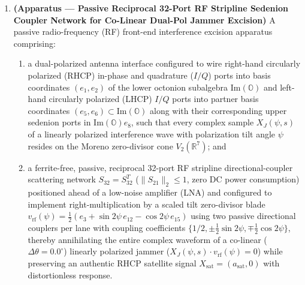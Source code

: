 \documentclass[12pt,letterpaper]{article}
\begin{document}
\begin{enumerate}[leftmargin=20pt,itemsep=4pt]
    \item \textbf{(Apparatus --- Passive Reciprocal 32-Port RF Stripline Sedenion Coupler Network for Co-Linear Dual-Pol Jammer Excision)} A passive radio-frequency (RF) front-end interference excision apparatus comprising:
    \begin{enumerate}[leftmargin=16pt,itemsep=1pt]
        \item a dual-polarized antenna interface configured to wire right-hand circularly polarized (RHCP) in-phase and quadrature ($I/Q$) ports into basis coordinates $(e_1, e_2)$ of the lower octonion subalgebra $\mathrm{Im}(\mathbb{O})$ and left-hand circularly polarized (LHCP) $I/Q$ ports into partner basis coordinates $(e_5, e_6) \subset \mathrm{Im}(\mathbb{O})$ along with their corresponding upper sedenion ports in $\mathrm{Im}(\mathbb{O})e_8$, such that every complex sample $X_J(\psi, s)$ of a linearly polarized interference wave with polarization tilt angle $\psi$ resides on the Moreno zero-divisor cone $V_2(\mathbb{R}^7)$; and
        \item a ferrite-free, passive, reciprocal 32-port RF stripline directional-coupler scattering network $S_{32} = S_{32}^T$ ($\|S_{21}\|_2 \le 1$, zero DC power consumption) positioned ahead of a low-noise amplifier (LNA) and configured to implement right-multiplication by a scaled tilt zero-divisor blade $v_{\mathrm{rf}}(\psi) = \frac{1}{2}(e_3 + \sin 2\psi\,e_{12} - \cos 2\psi\,e_{15})$ using two passive directional couplers per lane with coupling coefficients $\{1/2, \pm\frac{1}{2}\sin 2\psi, \mp\frac{1}{2}\cos 2\psi\}$, thereby annihilating the entire complex waveform of a co-linear ($\Delta\theta = 0.0^\circ$) linearly polarized jammer ($X_J(\psi, s)\cdot v_{\mathrm{rf}}(\psi) = 0$) while preserving an authentic RHCP satellite signal $X_{\mathrm{sat}} = (a_{\mathrm{sat}}, 0)$ with distortionless response.
    \end{enumerate}


\end{enumerate}
\end{document}
